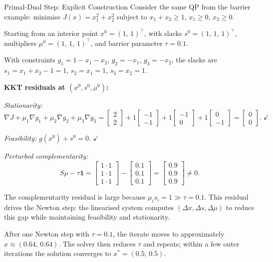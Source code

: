 \begin{examplebox}{Primal-Dual Step: Explicit Construction}
	Consider the same QP from the barrier example: minimise $J(x) = x_1^2 + x_2^2$ subject to $x_1 + x_2 \geq 1$, $x_1 \geq 0$, $x_2 \geq 0$.

	Starting from an interior point $x^0 = (1,\, 1)^\top$, with slacks $s^0 = (1,\, 1,\, 1)^\top$, multipliers $\mu^0 = (1,\, 1,\, 1)^\top$, and barrier parameter $\tau = 0.1$.

	\solution

	With constraints $g_1 = 1 - x_1 - x_2$, $g_2 = -x_1$, $g_3 = -x_2$, the slacks are $s_1 = x_1 + x_2 - 1 = 1$, $s_2 = x_1 = 1$, $s_3 = x_2 = 1$.

	\textbf{KKT residuals at $(x^0, s^0, \mu^0)$:}

	\emph{Stationarity:}
	\[
		\nabla J + \mu_1 \nabla g_1 + \mu_2 \nabla g_2 + \mu_3 \nabla g_3
		= \begin{bmatrix} 2 \\ 2 \end{bmatrix}
		+ 1 \begin{bmatrix} -1 \\ -1 \end{bmatrix}
		+ 1 \begin{bmatrix} -1 \\ 0 \end{bmatrix}
		+ 1 \begin{bmatrix} 0 \\ -1 \end{bmatrix}
		= \begin{bmatrix} 0 \\ 0 \end{bmatrix}. \; \checkmark
	\]

	\emph{Feasibility:} $g(x^0) + s^0 = 0$. $\checkmark$

	\emph{Perturbed complementarity:}
	\[
		S\mu - \tau \mathbf{1}
		= \begin{bmatrix} 1 \cdot 1 \\ 1 \cdot 1 \\ 1 \cdot 1 \end{bmatrix}
		- \begin{bmatrix} 0.1 \\ 0.1 \\ 0.1 \end{bmatrix}
		= \begin{bmatrix} 0.9 \\ 0.9 \\ 0.9 \end{bmatrix} \neq 0.
	\]

	The complementarity residual is large because $\mu_i s_i = 1 \gg \tau = 0.1$. This residual drives the Newton step: the linearised system computes $(\Delta x, \Delta s, \Delta \mu)$ to reduce this gap while maintaining feasibility and stationarity.

	After one Newton step with $\tau = 0.1$, the iterate moves to approximately $x \approx (0.64,\, 0.64)$. The solver then reduces $\tau$ and repeats; within a few outer iterations the solution converges to $x^* = (0.5,\, 0.5)$.
\end{examplebox}

